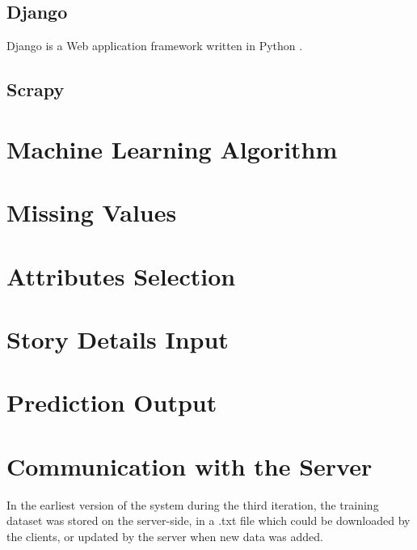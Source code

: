 \documentclass{mproj}
\begin{document}
\subsection{Django}

Django is a Web application framework written in Python \cite{django}. 

\subsection{Scrapy}\label{scrapy}

\section{Machine Learning Algorithm}

\section{Missing Values}\label{missing_values}

\section{Attributes Selection}

\section{Story Details Input}

\section{Prediction Output}

\section{Communication with the Server}

In the earliest version of the system during the third iteration, the training dataset was stored on the server-side, in a .txt file which could be downloaded by the clients, or updated by the server when new data was added. \par
\end{document}

